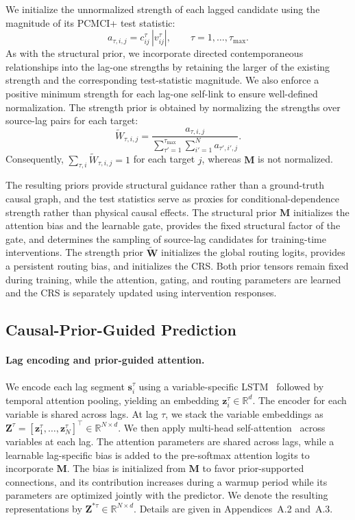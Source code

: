 \documentclass[letterpaper]{article}
\newcommand{\Wt}{\widetilde{\mathbf{W}}}
\newcommand{\Wts}{\widetilde{W}}
\begin{document}
We initialize the unnormalized strength of each lagged candidate using the magnitude of its PCMCI+ test statistic:
\begin{equation}
a_{\tau,i,j}=c^\tau_{ij}\,|v^\tau_{ij}|,\qquad \tau=1,\ldots,\tau_{\max}.
\label{eq:strength}
\end{equation}
As with the structural prior, we incorporate directed contemporaneous relationships into the lag-one strengths by retaining the larger of the existing strength and the corresponding test-statistic magnitude. We also enforce a positive minimum strength for each lag-one self-link to ensure well-defined normalization. The strength prior is obtained by normalizing the strengths over source-lag pairs for each target:
\begin{equation}
\Wts_{\tau,i,j}=\frac{a_{\tau,i,j}}{\sum_{\tau'=1}^{\tau_{\max}}\sum_{i'=1}^{N}a_{\tau',i',j}} .
\label{eq:Wprior}
\end{equation}
Consequently, $\sum_{\tau,i}\Wts_{\tau,i,j}=1$ for each target $j$, whereas $\mathbf{M}$ is not normalized.

The resulting priors provide structural guidance rather than a ground-truth causal graph, and the test statistics serve as proxies for conditional-dependence strength rather than physical causal effects. The structural prior $\mathbf{M}$ initializes the attention bias and the learnable gate, provides the fixed structural factor of the gate, and determines the sampling of source-lag candidates for training-time interventions. The strength prior $\Wt$ initializes the global routing logits, provides a persistent routing bias, and initializes the CRS. Both prior tensors remain fixed during training, while the attention, gating, and routing parameters are learned and the CRS is separately updated using intervention responses.

\subsection{Causal-Prior-Guided Prediction}

\paragraph{Lag encoding and prior-guided attention.}
We encode each lag segment $\mathbf{s}^\tau_i$ using a variable-specific LSTM~\cite{hochreiter1997lstm} followed by temporal attention pooling, yielding an embedding $\mathbf{z}^\tau_i\in\mathbb{R}^d$. The encoder for each variable is shared across lags. At lag $\tau$, we stack the variable embeddings as $\mathbf{Z}^\tau=[\mathbf{z}^\tau_1,\ldots,\mathbf{z}^\tau_N]^\top\in\mathbb{R}^{N\times d}$. We then apply multi-head self-attention~\cite{vaswani2017attention} across variables at each lag. The attention parameters are shared across lags, while a learnable lag-specific bias is added to the pre-softmax attention logits to incorporate $\mathbf{M}$. The bias is initialized from $\mathbf{M}$ to favor prior-supported connections, and its contribution increases during a warmup period while its parameters are optimized jointly with the predictor. We denote the resulting representations by $\mathbf{Z}^{*\tau}\in\mathbb{R}^{N\times d}$. Details are given in Appendices~A.2 and~A.3.
\end{document}
